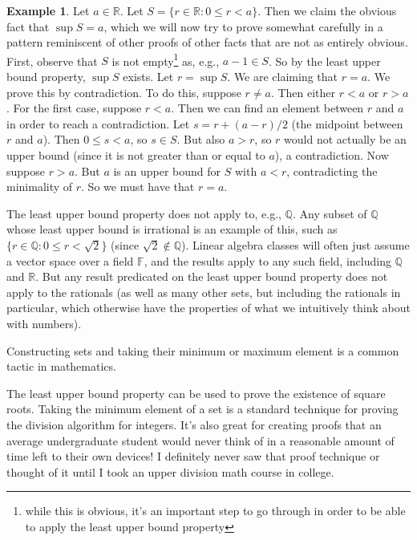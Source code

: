 \documentclass{article}
\theoremstyle{definition}
\newtheorem{example}{Example}[section]
\begin{document}
\begin{example} \label{supexample}
Let $a \in \mathbb{R}$. Let $S = \{r \in \mathbb{R} : 0 \leq r < a\}$. Then we claim the obvious fact that $\sup S = a$, which we will now try to prove somewhat carefully in a pattern reminiscent of other proofs of other facts that are not as entirely obvious. First, observe that $S$ is not empty\footnote{while this is obvious, it's an important step to go through in order to be able to apply the least upper bound property} as, e.g., $a - 1 \in S$. So by the least upper bound property, $\sup S$ exists. Let $r = \sup S$. We are claiming that $r = a$. We prove this by contradiction. To do this, suppose $r \neq a$. Then either $r < a$ or $r > a$. For the first case, suppose $r < a$. Then we can find an element between $r$ and $a$ in order to reach a contradiction. Let $s = r + (a - r)/2$ (the midpoint between $r$ and $a$). Then $0 \leq s < a$, so $s \in S$. But also $a > r$, so $r$ would not actually be an upper bound (since it is not greater than or equal to $a$), a contradiction. Now suppose $r > a$. But $a$ is an upper bound for $S$ with $a < r$, contradicting the minimality of $r$. So we must have that $r = a$.
\end{example}

The least upper bound property does not apply to, e.g., $\mathbb{Q}$. Any subset of $\mathbb{Q}$ whose least upper bound is irrational is an example of this, such as $\{r \in \mathbb{Q} : 0 \leq r < \sqrt{2}\}$ (since $\sqrt{2} \notin \mathbb{Q}$). Linear algebra classes will often just assume a vector space over a field $\mathbb{F}$, and the results apply to any such field, including $\mathbb{Q}$ and $\mathbb{R}$. But any result predicated on the least upper bound property does not apply to the rationals (as well as many other sets, but including the rationals in particular, which otherwise have the properties of what we intuitively think about with numbers).

Constructing sets and taking their minimum or maximum element is a common tactic in mathematics.

The least upper bound property can be used to prove the existence of square roots. Taking the minimum element of a set is a standard technique for proving the division algorithm for integers.  It's also great for creating proofs that an average undergraduate student would never think of in a reasonable amount of time left to their own devices! I definitely never saw that proof technique or thought of it until I took an upper division math course in college.
\end{document}
